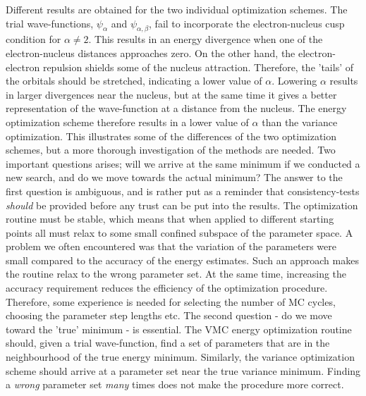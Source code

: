 Different results are obtained for the two individual optimization
schemes. The trial wave-functions, $\psi_{\alpha}$ and
$\psi_{\alpha,\beta}$, fail to incorporate the electron-nucleus cusp
condition for $\alpha \ne 2$. This results in an energy divergence when
one of the electron-nucleus distances approaches zero. On the other hand,
the electron-electron repulsion shields some of the nucleus
attraction. Therefore, the 'tails' of the orbitals should be
stretched, indicating a lower value of $\alpha$. Lowering $\alpha$
results in larger divergences near the nucleus, but at the same time
it gives a better representation of the wave-function at a distance
from the nucleus. The energy optimization scheme therefore results in
a lower value of $\alpha$ than the variance optimization.
This illustrates some of the differences of the two optimization 
schemes, but a more thorough investigation of the methods are
needed. Two important questions arises; will we arrive at the 
same minimum if we conducted a new search, and do we move towards the
actual minimum?
\newline
%
\newline
The answer to the first question is ambiguous, and is rather put as
a reminder that consistency-tests \emph{should} be provided before any
trust can be put into the results. The optimization routine must be
stable, which means that when applied to different starting points all
must relax to some small confined subspace of the parameter space.
A problem we often encountered was that the variation of the
parameters were small compared to the accuracy of the energy
estimates. Such an approach makes the routine relax to the wrong
parameter set. At the same time, increasing the accuracy requirement
reduces the efficiency of the optimization procedure. Therefore, some
experience is needed for selecting the number of MC cycles, choosing
the parameter step lengths etc. 
\newline
%
\newline
The second question - do we move toward the 'true' minimum - is
essential. The VMC energy optimization routine 
should, given a trial wave-function, find a set of parameters 
that are in the neighbourhood of the true energy minimum. Similarly,
the variance optimization scheme should arrive at a parameter set
near the true variance minimum. Finding a \emph{wrong} parameter set 
\emph{many} times does not make the procedure more correct. 
\newline

